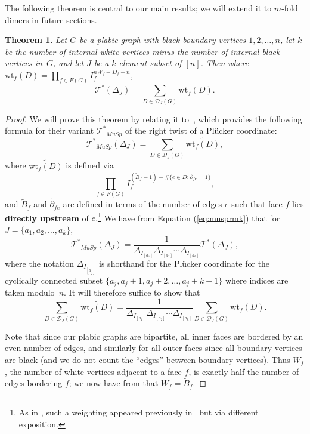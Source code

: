 \documentclass[11pt]{article}
\newtheorem{theorem}[theo]{Theorem}
\theoremstyle{definition}
\numberwithin{equation}{section}
\def\T {{\mathscr{T}^*}}
\numberwithin{equation}{section}
\begin{document}
The following theorem is central to our main results; we will extend it to $m$-fold dimers in future sections.
\begin{theorem}\label{theorem:facewts}
Let $G$ be a plabic graph with black boundary vertices $1,2, \dots, n$, let $k$ be the number of internal white vertices minus the number of internal black vertices in~$G$, and let $J$ be a $k$-element subset of $[n]$. Then where $\text{wt}_f(D)=\prod_{f \in F(G)} I_f^{nW_f-D_f-n}$,
\[\T(\Delta_J) = \sum_{D \in \mathcal{D}_J(G)} \text{wt}_f(D).\]
\end{theorem}
\begin{proof}
We will prove this theorem by relating it to~\cite[Remark~7.11]{mullerspeyer}, which provides the following formula for their variant $\T_{MuSp}$ of the right twist of a Pl\"ucker coordinate:
\[\T_{MuSp}(\Delta_J) = \sum_{D \in \mathcal{D}_J(G)} \widetilde{\text{wt}_f(D)},\]
where $\widetilde{\text{wt}_f(D)}$ is defined via \[\prod_{f \in F(G)} I_f^{(\tilde{B}_f-1) - \#\{e \in D : \tilde{\partial}_{fe} = 1\}},\] and $\tilde{B}_f$ and $\tilde{\partial}_{fe}$ are defined in terms of the number of edges $e$ such that face $f$ lies \textbf{directly upstream} of $e$.\footnote{As in \cite[Remark 5.8]{mullerspeyer}, such a weighting appeared previously in~\cite{octahedron} but via different exposition.} 
We have from Equation (\ref{eq:musprmk}) that for $J = \{a_1,a_2,\dots, a_k\}$,
\[\T_{MuSp}(\Delta_J) =  \frac{1}{\Delta_{I_{[a_1]}}\Delta_{I_{[a_2]}}\cdots \Delta_{I_{[a_k]}}} \T(\Delta_J),\]
where the notation $\Delta_{I_{[a_j]}}$ is shorthand for the Pl\"ucker coordinate for the cyclically connected subset $\{a_j, a_j+1, a_j+2, \dots, a_j + k-1\}$ where indices are taken modulo~$n$. It will therefore suffice to show that
\begin{equation}\label{eq:muspfacewts}
\sum_{D \in \mathcal{D}_J(G)} \widetilde{\text{wt}_f(D)} = \frac{1}{\Delta_{I_{[a_1]}}\Delta_{I_{[a_2]}}\cdots \Delta_{I_{[a_k]}}} \sum_{D \in \mathcal{D}_J(G)} \text{wt}_f(D).
\end{equation}

Note that since our plabic graphs are bipartite, all inner faces are bordered by an even number of edges, and similarly for all outer faces since all boundary vertices are black (and we do not count the ``edges'' between boundary vertices). Thus $W_f$, the number of white vertices adjacent to a face $f$, is exactly half the number of edges bordering $f$; we now have from \cite[Section 5.1]{mullerspeyer} that $W_f=\tilde{B}_f$.


\end{proof}
\end{document}
